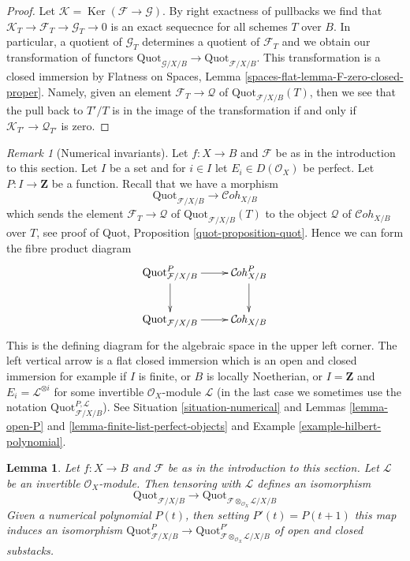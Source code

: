 \documentclass{stacks-project}
\theoremstyle{plain}
\newtheorem{lemma}[subsection]{Lemma}
\theoremstyle{definition}
\theoremstyle{remark}
\newtheorem{remark}[subsection]{Remark}
\numberwithin{equation}{subsection}
\def\Ker{\mathop{\mathrm{Ker}}}
\def\Cohstack{\mathcal{C}\!\mathit{oh}}
\def\Quotfunctor{\mathrm{Quot}}
\begin{document}
\begin{proof}
Let $\mathcal{K} = \Ker(\mathcal{F} \to \mathcal{G})$. By right
exactness of pullbacks we find that
$\mathcal{K}_T \to \mathcal{F}_T \to \mathcal{G}_T \to 0$
is an exact sequecnce for all schemes $T$ over $B$.
In particular, a quotient of $\mathcal{G}_T$
determines a quotient of $\mathcal{F}_T$ and we obtain our transformation
of functors
$\Quotfunctor_{\mathcal{G}/X/B} \to \Quotfunctor_{\mathcal{F}/X/B}$.
This transformation is a closed immersion by
Flatness on Spaces, Lemma \ref{spaces-flat-lemma-F-zero-closed-proper}.
Namely, given an element $\mathcal{F}_T \to \mathcal{Q}$ of
$\Quotfunctor_{\mathcal{F}/X/B}(T)$, then we see that the pull
back to $T'/T$ is in the image of the transformation if and
only if $\mathcal{K}_{T'} \to \mathcal{Q}_{T'}$ is zero.
\end{proof}

\begin{remark}[Numerical invariants]
\label{remark-quot-numerical}
Let $f : X \to B$ and $\mathcal{F}$ be as in the introduction to this section.
Let $I$ be a set and for $i \in I$ let $E_i \in D(\mathcal{O}_X)$ be perfect.
Let $P : I \to \mathbf{Z}$ be a function. Recall that we have a morphism
$$
\Quotfunctor_{\mathcal{F}/X/B} \longrightarrow \Cohstack_{X/B}
$$
which sends the element $\mathcal{F}_T \to \mathcal{Q}$
of $\Quotfunctor_{\mathcal{F}/X/B}(T)$ to the object $\mathcal{Q}$
of $\Cohstack_{X/B}$ over $T$, see proof of
Quot, Proposition \ref{quot-proposition-quot}. Hence we can form
the fibre product diagram
$$
\xymatrix{
\Quotfunctor^P_{\mathcal{F}/X/B} \ar[r] \ar[d] &
\Cohstack^P_{X/B} \ar[d] \\
\Quotfunctor_{\mathcal{F}/X/B} \ar[r] &
\Cohstack_{X/B}
}
$$
This is the defining diagram for the algebraic space in the
upper left corner. The left vertical arrow is a
flat closed immersion which is an open and closed immersion
for example if $I$ is finite, or $B$ is locally Noetherian, or
$I = \mathbf{Z}$ and $E_i = \mathcal{L}^{\otimes i}$ for some
invertible $\mathcal{O}_X$-module $\mathcal{L}$ (in the last
case we sometimes use the notation
$\Quotfunctor^{P, \mathcal{L}}_{\mathcal{F}/X/B}$).
See Situation \ref{situation-numerical} and
Lemmas \ref{lemma-open-P} and \ref{lemma-finite-list-perfect-objects} and
Example \ref{example-hilbert-polynomial}.
\end{remark}

\begin{lemma}
\label{lemma-quot-tensor-invertible}
Let $f : X \to B$ and $\mathcal{F}$ be as in the introduction to this section.
Let $\mathcal{L}$ be an invertible $\mathcal{O}_X$-module.
Then tensoring with $\mathcal{L}$ defines an isomorphism
$$
\Quotfunctor_{\mathcal{F}/X/B}
\longrightarrow
\Quotfunctor_{\mathcal{F} \otimes_{\mathcal{O}_X} \mathcal{L}/X/B}
$$
Given a numerical polynomial $P(t)$, then setting $P'(t) = P(t + 1)$
this map induces an isomorphism
$\Quotfunctor^P_{\mathcal{F}/X/B}
\longrightarrow
\Quotfunctor^{P'}_{\mathcal{F} \otimes_{\mathcal{O}_X} \mathcal{L}/X/B}$
of open and closed substacks.
\end{lemma}
\end{document}

